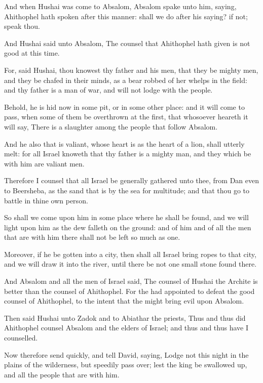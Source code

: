 \verse And when Hushai was come to Absalom, Absalom spake unto him, saying, Ahithophel hath spoken after this manner: shall we do after his saying? if not; speak thou.

\verse And Hushai said unto Absalom, The counsel that Ahithophel hath given is not good at this time.

\verse For, said Hushai, thou knowest thy father and his men, that they be mighty men, and they be chafed in their minds, as a bear robbed of her whelps in the field: and thy father is a man of war, and will not lodge with the people.

\verse Behold, he is hid now in some pit, or in some other place: and it will come to pass, when some of them be overthrown at the first, that whosoever heareth it will say, There is a slaughter among the people that follow Absalom.

\verse And he also that is valiant, whose heart is as the heart of a lion, shall utterly melt: for all Israel knoweth that thy father is a mighty man, and they which be with him are valiant men.

\verse Therefore I counsel that all Israel be generally gathered unto thee, from Dan even to Beersheba, as the sand that is by the sea for multitude; and that thou go to battle in thine own person.

\verse So shall we come upon him in some place where he shall be found, and we will light upon him as the dew falleth on the ground: and of him and of all the men that are with him there shall not be left so much as one.

\verse Moreover, if he be gotten into a city, then shall all Israel bring ropes to that city, and we will draw it into the river, until there be not one small stone found there.

\verse And Absalom and all the men of Israel said, The counsel of Hushai the Archite is better than the counsel of Ahithophel. For the \LORD had appointed to defeat the good counsel of Ahithophel, to the intent that the \LORD might bring evil upon Absalom.

\verse Then said Hushai unto Zadok and to Abiathar the priests, Thus and thus did Ahithophel counsel Absalom and the elders of Israel; and thus and thus have I counselled.

\verse Now therefore send quickly, and tell David, saying, Lodge not this night in the plains of the wilderness, but speedily pass over; lest the king be swallowed up, and all the people that are with him.


